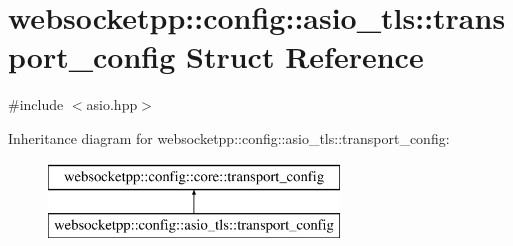 \hypertarget{structwebsocketpp_1_1config_1_1asio__tls_1_1transport__config}{}\section{websocketpp\+:\+:config\+:\+:asio\+\_\+tls\+:\+:transport\+\_\+config Struct Reference}
\label{structwebsocketpp_1_1config_1_1asio__tls_1_1transport__config}


{\ttfamily \#include $<$asio.\+hpp$>$}

Inheritance diagram for websocketpp\+:\+:config\+:\+:asio\+\_\+tls\+:\+:transport\+\_\+config\+:\begin{figure}[H]
\begin{center}
\leavevmode
\includegraphics[height=2.000000cm]{structwebsocketpp_1_1config_1_1asio__tls_1_1transport__config}
\end{center}
\end{figure}
